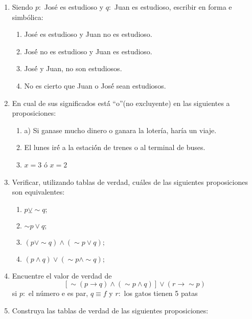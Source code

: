 {\begin{enumerate}
\begin{enumerate}
\item $p\veebar q\equiv\left(p\vee q\right)\wedge\sim\left(p\wedge q\right)$
\item $\sim\left[p\rightarrow\sim\left(q\veebar\sim p\right)\right]\leftrightarrow\left(p\wedge q\right)$
\end{enumerate}
\item Siendo $p:$ José es estudioso y $q:$ Juan es estudioso, escribir
en forma e simbólica:

\begin{enumerate}
\item José es estudioso y Juan no es estudioso.
\item Jos\'{é} no es estudioso y Juan es estudioso.
\item Jos\'{é} y Juan, no son estudiosos.
\item No es cierto que Juan o Jos\'{é} sean estudiosos. 
\end{enumerate}
\item En cual de sus significados est\'{á} “o”(no excluyente) en las siguientes
a proposiciones: 

\begin{enumerate}
\item a) Si ganase mucho dinero o ganara la lotería, haría un viaje.
\item El lunes ir\'{é} a la estaci\'{ó}n de trenes o al terminal de buses.
\item $x=3$ ó $x=2$
\end{enumerate}
\item Verificar, utilizando tablas de verdad, cuáles de las siguientes proposiciones
son equivalentes:

\begin{enumerate}
\item $p\veebar\sim q;$
\item $\sim p\vee q;$
\item $\left(p\vee\sim q\right)\wedge\left(\sim p\vee q\right);$
\item $\left(p\wedge q\right)\vee\left(\sim p\wedge\sim q\right);$
\end{enumerate}
\item Encuentre el valor de verdad de 
\[
\left[\sim\left(p\rightarrow q\right)\wedge\left(\sim p\wedge q\right)\right]\vee\left(r\rightarrow\sim p\right)
\]
\medskip{}
si $p:$ el número e es par, $q\equiv f$ y $r:$ los gatos tienen
5 patas
\item Construya las tablas de verdad de las siguientes proposiciones:


\end{enumerate}}

